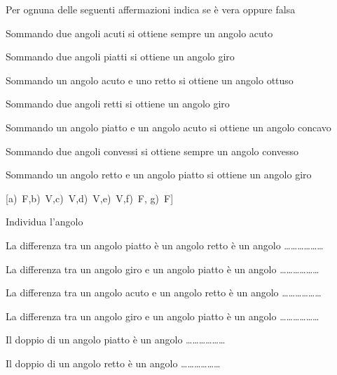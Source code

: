 % 

\begin{esercizio}
\label{ese:1.77}
Per ognuna delle seguenti affermazioni indica se è vera oppure falsa
\vspace{-6pt}
\begin{enumeratea}
\item Sommando due angoli acuti si ottiene sempre un angolo acuto
\hfill\boxV\quad\boxF
\item Sommando due angoli piatti si ottiene un angolo giro
\hfill\boxV\quad\boxF
\item Sommando un angolo acuto e uno retto si ottiene un angolo ottuso
\hfill\boxV\quad\boxF
\item Sommando due angoli retti si ottiene un angolo giro
\hfill\boxV\quad\boxF
\item Sommando un angolo piatto e un angolo acuto si ottiene un 
angolo concavo
\hfill\boxV\quad\boxF
\item Sommando due angoli convessi si ottiene sempre un angolo convesso
\hfill\boxV\quad\boxF
\item Sommando un angolo retto e un angolo piatto si ottiene un 
angolo giro
\hfill\boxV\quad\boxF
\end{enumeratea}
\hfill[a)~F,\quad b)~V,\quad c)~V,\quad d)~V,\quad e)~V,\quad f)~F,\quad 
g)~F]
\end{esercizio}

\begin{esercizio}
\label{ese:1.78}
Individua l'angolo
\vspace{-6pt}
\begin{enumeratea}
\item La differenza tra un angolo piatto è un angolo retto è un 
angolo \ldots\ldots\ldots\ldots\ldots\ldots{}
\item La differenza tra un angolo giro e un angolo piatto è un angolo 
\ldots\ldots\ldots\ldots\ldots\ldots{}
\item La differenza tra un angolo acuto e un angolo retto è un angolo 
\ldots\ldots\ldots\ldots\ldots\ldots{}
\item La differenza tra un angolo giro e un angolo piatto è un angolo 
\ldots\ldots\ldots\ldots\ldots\ldots{}
\item Il doppio di un angolo piatto è un angolo 
\ldots\ldots\ldots\ldots\ldots\ldots{}
\item Il doppio di un angolo retto è un angolo 
\ldots\ldots\ldots\ldots\ldots\ldots{}
\end{enumeratea}
\end{esercizio}
	
